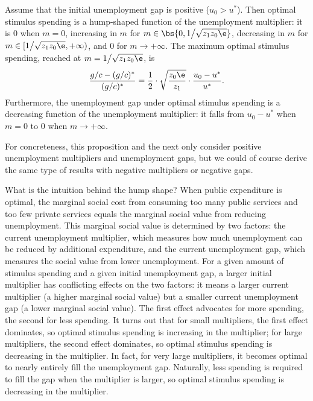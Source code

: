 \documentclass[letterpaper,12pt,leqno]{article}
\begin{document}
\begin{bibunit}
\begin{prop} Assume that the initial unemployment gap is positive ($u_{0}> u^{*}$). Then optimal stimulus spending is a hump-shaped function of the unemployment multiplier: it is 0 when $m=0$, increasing in $m$ for $m\in\bs{0,1\big/\sqrt{z_1 z_0 \e}}$, decreasing in $m$ for $m\in[1\big/\sqrt{z_1 z_0 \e},+\infty)$, and $0$ for $m\to +\infty$. The maximum optimal stimulus spending, reached at $m=1\big/\sqrt{z_1 z_0 \e}$, is
\begin{equation*}
\frac{g/c-(g/c)^{*}}{(g/c)^{*}}=\frac{1}{2} \cdot \sqrt{\frac{z_0 \e}{z_1}}\cdot\frac{u_{0}-u^{*}}{u^{*}}.
\end{equation*}
Furthermore, the unemployment gap under optimal stimulus spending is a decreasing function of the unemployment multiplier: it falls from $u_{0}-u^*$ when $m=0$ to $0$ when $m\to +\infty$.\end{prop}

For concreteness, this proposition and the next only consider positive unemployment multipliers and unemployment gaps, but we could of course derive the same type of results with negative multipliers or negative gaps.

What is the intuition behind the hump shape? When public expenditure is optimal, the marginal social cost from consuming too many public services and too few private services equals the marginal social value from reducing unemployment. This marginal social value is determined by two factors: the current unemployment multiplier, which measures how much unemployment can be reduced by additional expenditure, and the current unemployment gap, which measures the social value from lower unemployment. For a given amount of stimulus spending and a given initial unemployment gap, a larger initial multiplier has conflicting effects on the two factors: it means a larger current multiplier (a higher marginal social value) but a smaller current unemployment gap (a lower marginal social value). The first effect advocates for more spending, the second for less spending. It turns out that for small multipliers, the first effect dominates, so optimal stimulus spending is increasing in the multiplier; for large multipliers, the second effect dominates, so optimal stimulus spending is decreasing in the multiplier. In fact, for very large multipliers, it becomes optimal to nearly entirely fill the unemployment gap. Naturally, less spending is required to fill the gap when the multiplier is larger, so optimal stimulus spending is decreasing in the multiplier.


\end{bibunit}
\end{document}
